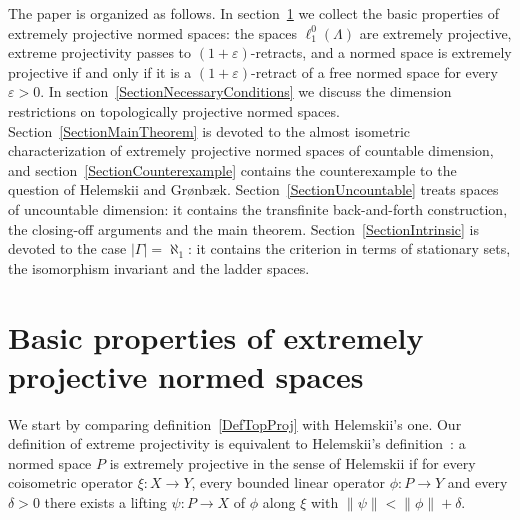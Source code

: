 \documentclass[12pt]{article}
\newcommand{\lo}[1]{\ell_1^0(#1)}
\newcommand{\norm}[1]{\lVert #1\rVert}
\begin{document}
The paper is organized as follows. In section~\ref{SectionBasicTheory} we
collect the basic properties of extremely projective normed spaces: the
spaces $\lo{\Lambda}$ are extremely projective, extreme projectivity passes
to $(1+\varepsilon)$-retracts, and a normed space is extremely projective if
and only if it is a $(1+\varepsilon)$-retract of a free normed space for every
$\varepsilon>0$. In section~\ref{SectionNecessaryConditions} we discuss the
dimension restrictions on topologically projective normed spaces.
Section~\ref{SectionMainTheorem} is devoted to the almost isometric
characterization of extremely projective normed spaces of countable
dimension, and section~\ref{SectionCounterexample} contains the
counterexample to the question of Helemskii and Gr{\o}nb{\ae}k.
Section~\ref{SectionUncountable} treats spaces of uncountable dimension: it
contains the transfinite back-and-forth construction, the closing-off
arguments and the main theorem. Section~\ref{SectionIntrinsic} is devoted to
the case $|\Gamma|=\aleph_1$: it contains the criterion in terms of
stationary sets, the isomorphism invariant and the ladder spaces.


\section{Basic properties of extremely projective normed
  spaces}\label{SectionBasicTheory}

We start by comparing definition~\ref{DefTopProj} with Helemskii's one.
Our definition of extreme projectivity is equivalent to Helemskii's
definition~\cite[definition I]{HelExtrProjSeqAlg}: a normed space $P$ is
extremely projective in the sense of Helemskii if for every coisometric operator
$\xi:X\to Y$, every bounded linear operator $\phi:P\to Y$ and every
$\delta>0$ there exists a lifting $\psi:P\to X$ of $\phi$ along $\xi$ with
$\norm{\psi}<\norm{\phi}+\delta$.
\end{document}
